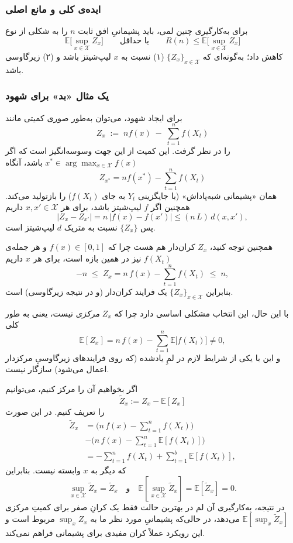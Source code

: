 \documentclass[a4paper,10pt,twocolumn]{article}
\begin{document}
\subsubsection{ایده‌ی کلی و مانع اصلی}
برای به‌کارگیری چنین لمی، باید پشیمانیِ افق ثابت $n$ را به شکلی از نوع
\[
\mathbb{E}\Big[\sup_{x\in\mathcal{X}} Z_x\Big]
\qquad\text{یا حداقل}\qquad
R(n)\le \mathbb{E}\Big[\sup_{x\in\mathcal{X}} Z_x\Big]
\]
کاهش داد؛ به‌گونه‌ای که $\{Z_x\}_{x\in\mathcal{X}}$ (۱) نسبت به $x$ لیپ‌شیتز باشد و (۲) زیرگاوسی باشد.

\subsubsection{یک مثال «بد» برای شهود}
برای ایجاد شهود، می‌توان به‌طور صوری کمیتی مانند
\[
Z_x \;:=\; n f(x)\;-\;\sum_{t=1}^n f(X_t)
\]
را در نظر گرفت. این کمیت از این جهت وسوسه‌انگیز است که
اگر $x^\ast\in\arg\max_{x\in\mathcal{X}} f(x)$ باشد، آنگاه
\[
Z_{x^\ast}=n f(x^\ast)-\sum_{t=1}^n f(X_t)
\]
همان «پشیمانی شبه‌پاداش» (با جایگزینی $Y_t$ به جای $f(X_t)$) را بازتولید می‌کند.
همچنین اگر $f$ لیپ‌شیتز باشد، برای هر $x,x'\in\mathcal{X}$ داریم
\[
|Z_x-Z_{x'}|
=
n\,|f(x)-f(x')|
\le
(n\,L)\,d(x,x'),
\]
پس $\{Z_x\}$ نسبت به متریک $d$ لیپ‌شیتز است.

همچنین توجه کنید، \(Z_x\) کران‌دار هم هست چرا که
$f(x)\in[0,1]$ و هر جمله‌ی $f(X_t)$ نیز در همین بازه است، برای هر $x$ داریم
\[
-n \;\le\; Z_x
=
n\, f(x) - \sum_{t=1}^n f(X_t)
\;\le\; n,
\]
بنابراین $\{Z_x\}_{x\in\mathcal{X}}$ یک فرایند کران‌دار (و در نتیجه زیرگاوسی) است.

با این حال، این انتخاب مشکلی اساسی دارد چرا که $Z_x$ \emph{مرکزی} نیست، یعنی به طور کلی
\[
\mathbb{E}[Z_x]
=
n\, f(x) - \sum_{t=1}^n \mathbb{E}\bigl[f(X_t)\bigr]
\neq 0,
\]
و این با یکی از شرایط لازم در لمِ یادشده (که روی فرایندهای زیرگاوسیِ مرکزدار اعمال می‌شود) سازگار نیست.

اگر بخواهیم آن را مرکز کنیم، می‌توانیم
\[
\tilde Z_x := Z_x - \mathbb{E}[Z_x]
\]
را تعریف کنیم.
در این صورت
\begin{align*}
    \tilde Z_x &=
    \bigl(n\, f(x) - \sum_{t=1}^n f(X_t)\bigr)\\
    &-
    \bigl(n\, f(x) - \sum_{t=1}^n \mathbb{E}[f(X_t)]\bigr)\\
    &=
    -\sum_{t=1}^n f(X_t)
    +
    \sum_{t=1}^b \mathbb{E}[f(X_t)],
\end{align*}
که دیگر به $x$ وابسته نیست.
بنابراین
\[
\sup_{x\in\mathcal{X}} \tilde Z_x = \tilde Z_x
\quad\text{و}\quad
\mathbb{E}\!\left[\sup_{x\in\mathcal{X}} \tilde Z_x\right]
=
\mathbb{E}[\tilde Z_x]
=
0.
\]
در نتیجه، به‌کارگیری آن لم در بهترین حالت فقط یک کرانِ صفر برای کمیتِ مرکزی
$\mathbb{E}[\sup_x \tilde Z_x]$ می‌دهد، در حالی‌که پشیمانیِ مورد نظر ما به
$\sup_x Z_x$ مربوط است و این رویکرد عملاً کران مفیدی برای پشیمانی فراهم نمی‌کند.
\end{document}

